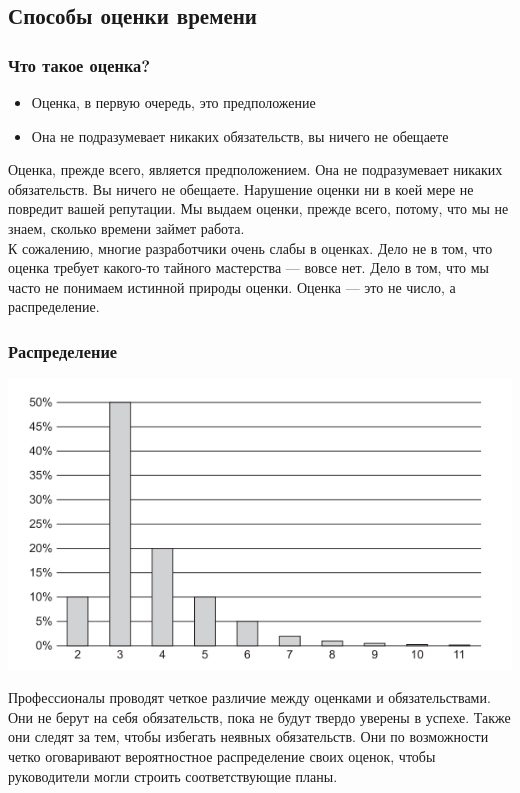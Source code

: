 \documentclass{../industrial-development}
\begin{document}
\subsection{Способы оценки времени}
\begin{frame} \frametitle{Что такое оценка?}
\begin{itemize}
  \item Оценка, в первую очередь, это предположение
	\item Она не подразумевает никаких обязательств, вы ничего не обещаете
\end{itemize}
\end{frame}
\lecturenotes
Оценка, прежде всего, является предположением. Она не подразумевает никаких обязательств. Вы ничего не обещаете. Нарушение оценки ни в коей мере не повредит вашей репутации. Мы выдаем оценки, прежде всего, потому, что мы не знаем, сколько времени займет работа.\\
К сожалению, многие разработчики очень слабы в оценках. Дело не в том, что оценка требует какого-то тайного мастерства — вовсе нет. Дело в том, что мы часто не понимаем истинной природы оценки. Оценка — это не число, а распределение. 

\begin{frame} \frametitle{Распределение}
{\includegraphics[width=1\linewidth]{time-estimate.png}}
\end{frame}
\lecturenotes
Профессионалы проводят четкое различие между оценками и обязательствами. Они не берут на себя обязательств, пока не будут твердо уверены в успехе. Также они следят за тем, чтобы избегать неявных обязательств. Они по возможности четко оговаривают вероятностное распределение своих оценок, чтобы руководители могли строить соответствующие планы.
\end{document}
